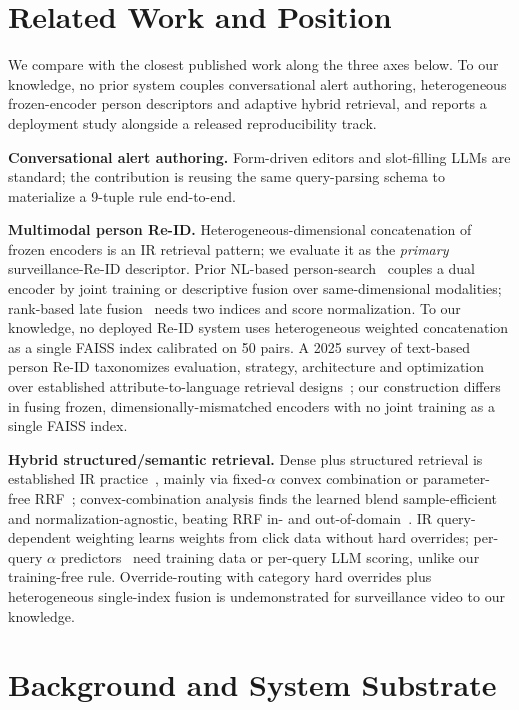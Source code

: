 ﻿\documentclass[conference]{IEEEtran}
\theoremstyle{plain}
\begin{document}
\section{Related Work and Position}

We compare with the closest published work along the three axes below. To our knowledge, no prior system couples conversational alert authoring, heterogeneous frozen-encoder person descriptors and adaptive hybrid retrieval, and reports a deployment study alongside a released reproducibility track.

\textbf{Conversational alert authoring.} Form-driven editors and slot-filling LLMs are standard; the contribution is reusing the same query-parsing schema to materialize a 9-tuple rule end-to-end.

\textbf{Multimodal person Re-ID.} Heterogeneous-dimensional concatenation of frozen encoders is an IR retrieval pattern; we evaluate it as the \emph{primary} surveillance-Re-ID descriptor. Prior NL-based person-search~\cite{b32} couples a dual encoder by joint training or descriptive fusion over same-dimensional modalities; rank-based late fusion~\cite{b27} needs two indices and score normalization. To our knowledge, no deployed Re-ID system uses heterogeneous weighted concatenation as a single FAISS index calibrated on 50 pairs. A 2025 survey of text-based person Re-ID taxonomizes evaluation, strategy, architecture and optimization over established attribute-to-language retrieval designs~\cite{b36}; our construction differs in fusing frozen, dimensionally-mismatched encoders with no joint training as a single FAISS index.

\textbf{Hybrid structured/semantic retrieval.} Dense plus structured retrieval is established IR practice~\cite{b25,b27,b29}, mainly via fixed-$\alpha$ convex combination or parameter-free RRF~\cite{b27}; convex-combination analysis finds the learned blend sample-efficient and normalization-agnostic, beating RRF in- and out-of-domain~\cite{b33}. IR query-dependent weighting learns weights from click data without hard overrides; per-query $\alpha$ predictors~\cite{b34} need training data or per-query LLM scoring, unlike our training-free rule. Override-routing with category hard overrides plus heterogeneous single-index fusion is undemonstrated for surveillance video to our knowledge.

\section{Background and System Substrate}
\end{document}
